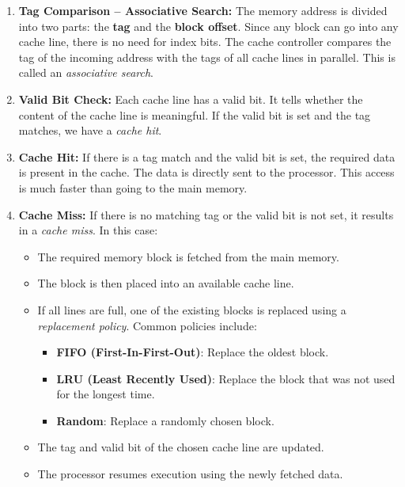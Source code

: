 \documentclass[12pt]{book}
\begin{document}
\begin{enumerate}
    \item \textbf{Tag Comparison – Associative Search:}  
    The memory address is divided into two parts: the \textbf{tag} and the \textbf{block offset}. Since any block can go into any cache line, there is no need for index bits.  
    The cache controller compares the tag of the incoming address with the tags of all cache lines in parallel. This is called an \textit{associative search}.

    \item \textbf{Valid Bit Check:}  
    Each cache line has a valid bit. It tells whether the content of the cache line is meaningful.  
    If the valid bit is set and the tag matches, we have a \textit{cache hit}.

    \item \textbf{Cache Hit:}  
    If there is a tag match and the valid bit is set, the required data is present in the cache. The data is directly sent to the processor. This access is much faster than going to the main memory.

    \item \textbf{Cache Miss:}  
    If there is no matching tag or the valid bit is not set, it results in a \textit{cache miss}. In this case:
    \begin{itemize}
        \item The required memory block is fetched from the main memory.
        \item The block is then placed into an available cache line.
        \item If all lines are full, one of the existing blocks is replaced using a \textit{replacement policy}. Common policies include:
        \begin{itemize}
            \item \textbf{FIFO (First-In-First-Out)}: Replace the oldest block.
            \item \textbf{LRU (Least Recently Used)}: Replace the block that was not used for the longest time.
            \item \textbf{Random}: Replace a randomly chosen block.
        \end{itemize}
        \item The tag and valid bit of the chosen cache line are updated.
        \item The processor resumes execution using the newly fetched data.
    \end{itemize}
\end{enumerate}
\end{document}
